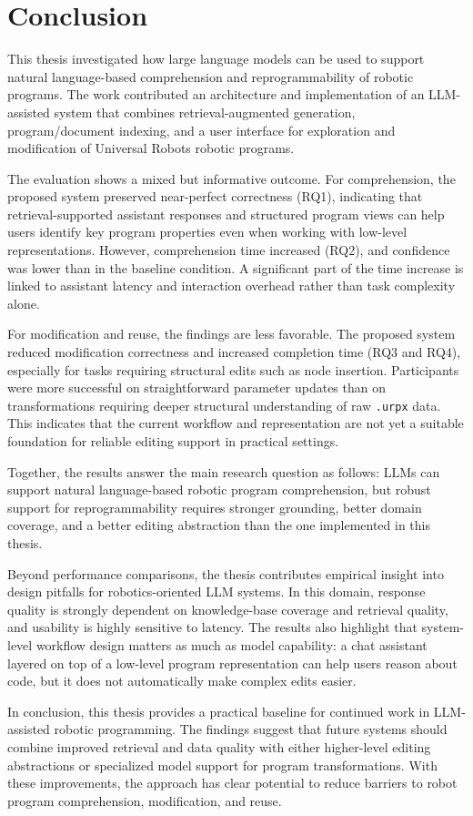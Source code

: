 \chapter{Conclusion}
This thesis investigated how large language models can be used to support natural language-based comprehension and reprogrammability of robotic programs. The work contributed an architecture and implementation of an LLM-assisted system that combines retrieval-augmented generation, program/document indexing, and a user interface for exploration and modification of Universal Robots robotic programs.

The evaluation shows a mixed but informative outcome. For comprehension, the proposed system preserved near-perfect correctness (RQ1), indicating that retrieval-supported assistant responses and structured program views can help users identify key program properties even when working with low-level representations. However, comprehension time increased (RQ2), and confidence was lower than in the baseline condition. A significant part of the time increase is linked to assistant latency and interaction overhead rather than task complexity alone.

For modification and reuse, the findings are less favorable. The proposed system reduced modification correctness and increased completion time (RQ3 and RQ4), especially for tasks requiring structural edits such as node insertion. Participants were more successful on straightforward parameter updates than on transformations requiring deeper structural understanding of raw \texttt{.urpx} data. This indicates that the current workflow and representation are not yet a suitable foundation for reliable editing support in practical settings.

Together, the results answer the main research question as follows: LLMs can support natural language-based robotic program comprehension, but robust support for reprogrammability requires stronger grounding, better domain coverage, and a better editing abstraction than the one implemented in this thesis.

Beyond performance comparisons, the thesis contributes empirical insight into design pitfalls for robotics-oriented LLM systems. In this domain, response quality is strongly dependent on knowledge-base coverage and retrieval quality, and usability is highly sensitive to latency. The results also highlight that system-level workflow design matters as much as model capability: a chat assistant layered on top of a low-level program representation can help users reason about code, but it does not automatically make complex edits easier.

In conclusion, this thesis provides a practical baseline for continued work in LLM-assisted robotic programming. The findings suggest that future systems should combine improved retrieval and data quality with either higher-level editing abstractions or specialized model support for program transformations. With these improvements, the approach has clear potential to reduce barriers to robot program comprehension, modification, and reuse.
